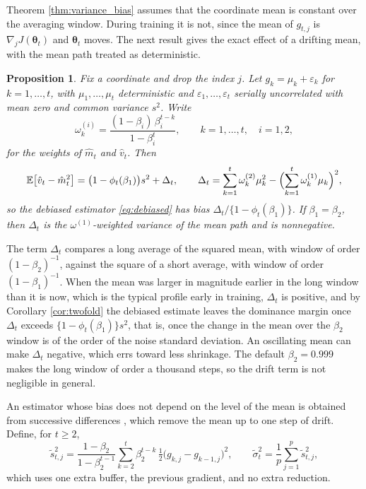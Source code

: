 \documentclass[pdflatex,sn-mathphys-num]{sn-jnl}%
\theoremstyle{thmstyleone}%
\newtheorem{proposition}[theorem]{Proposition}%
\theoremstyle{thmstyletwo}%
\theoremstyle{thmstylethree}%
\newenvironment{revblock}{\color{blue}}{}
\newcommand{\E}{\mathbb{E}}
\begin{document}
\begin{revblock}
Theorem \ref{thm:variance_bias} assumes that the coordinate mean is constant over the averaging window. During training it is not, since the mean of $g_{t,j}$ is $\nabla_jJ(\bm\theta_t)$ and $\bm\theta_t$ moves. The next result gives the exact effect of a drifting mean, with the mean path treated as deterministic.

\begin{proposition}
\label{prop:drift}
Fix a coordinate and drop the index $j$. Let $g_k=\mu_k+\varepsilon_k$ for $k=1,\dots,t$, with $\mu_1,\dots,\mu_t$ deterministic and $\varepsilon_1,\dots,\varepsilon_t$ serially uncorrelated with mean zero and common variance $s^2$. Write
\begin{equation}
\omega^{(i)}_{k}=\frac{(1-\beta_i)\,\beta_i^{t-k}}{1-\beta_i^{t}},
\qquad k=1,\dots,t,\quad i=1,2,
\end{equation}
for the weights of $\hat m_t$ and $\hat v_t$. Then
\begin{equation}
\label{eq:drift_bias}
\E\bigl[\hat v_t-\hat m^2_t\bigr]=\bigl(1-\phi_t(\beta_1)\bigr)s^2+\Delta_t,
\qquad
\Delta_t=\sum_{k=1}^{t}\omega^{(2)}_k\mu^2_k-\Bigl(\sum_{k=1}^{t}\omega^{(1)}_k\mu_k\Bigr)^{2},
\end{equation}
so the debiased estimator \eqref{eq:debiased} has bias $\Delta_t/\{1-\phi_t(\beta_1)\}$. If $\beta_1=\beta_2$, then $\Delta_t$ is the $\omega^{(1)}$-weighted variance of the mean path and is nonnegative.
\end{proposition}

The term $\Delta_t$ compares a long average of the squared mean, with window of order $(1-\beta_2)^{-1}$, against the square of a short average, with window of order $(1-\beta_1)^{-1}$. When the mean was larger in magnitude earlier in the long window than it is now, which is the typical profile early in training, $\Delta_t$ is positive, and by Corollary \ref{cor:twofold} the debiased estimate leaves the dominance margin once $\Delta_t$ exceeds $\{1-\phi_t(\beta_1)\}s^2$, that is, once the change in the mean over the $\beta_2$ window is of the order of the noise standard deviation. An oscillating mean can make $\Delta_t$ negative, which errs toward less shrinkage. The default $\beta_2=0.999$ makes the long window of order a thousand steps, so the drift term is not negligible in general.

An estimator whose bias does not depend on the level of the mean is obtained from successive differences \cite{vonneumann1941}, which remove the mean up to one step of drift. Define, for $t\ge2$,
\begin{equation}
\label{eq:diff_estimator}
\tilde s^2_{t,j}=\frac{1-\beta_2}{1-\beta_2^{t-1}}\sum_{k=2}^{t}\beta_2^{t-k}\,\tfrac12\bigl(g_{k,j}-g_{k-1,j}\bigr)^2 ,
\qquad
\tilde\sigma^2_t=\frac1p\sum_{j=1}^{p}\tilde s^2_{t,j},
\end{equation}
which uses one extra buffer, the previous gradient, and no extra reduction.


\end{revblock}
\end{document}
